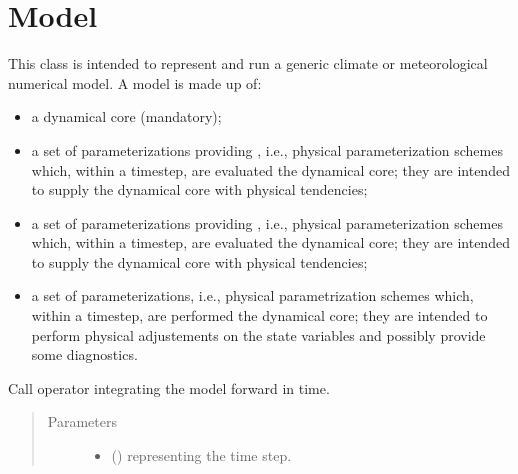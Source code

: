 \documentclass[letterpaper,10pt,english]{sphinxmanual}
\begin{document}
\section{Model}
\label{\detokenize{api:model}}

\begin{fulllineitems}
\label{\detokenize{api:tasmania.model.Model}}
This class is intended to represent and run a generic climate or meteorological numerical model.
A model is made up of:
\begin{itemize}
\item {} 
a dynamical core (mandatory);

\item {} 
a set of parameterizations providing , i.e., physical parameterization                       schemes which, within a timestep, are evaluated  the dynamical core; they are intended                  to supply the dynamical core with physical tendencies;

\item {} 
a set of parameterizations providing , i.e., physical parameterization                       schemes which, within a timestep, are evaluated  the dynamical core; they are intended                  to supply the dynamical core with physical tendencies;

\item {} 
a set of  parameterizations, i.e., physical parametrization schemes which,                             within a timestep, are performed  the dynamical core; they are intended to perform physical                      adjustements on the state variables and possibly provide some diagnostics.

\end{itemize}

\begin{fulllineitems}
\label{\detokenize{api:tasmania.model.Model.__call__}}
Call operator integrating the model forward in time.
\begin{quote}\begin{description}
\item[{Parameters}] \leavevmode\begin{itemize}
\item {} 
 () \textendash{}  representing the time step.


\end{itemize}
\end{description}
\end{quote}
\end{fulllineitems}
\end{fulllineitems}
\end{document}
